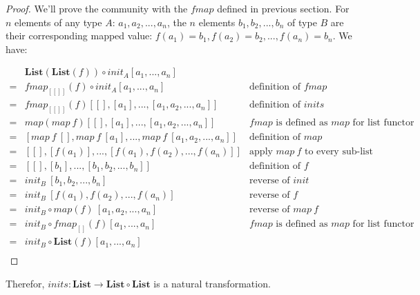 \documentclass{article}
\begin{document}
\begin{example}
\begin{proof}
We'll prove the community with the $fmap$ defined in previous section. For $n$ elements of any type $A$: $a_1, a_2, ..., a_n$, the $n$ elements $b_1, b_2, ..., b_n$ of type $B$ are their corresponding mapped value: $f(a_1) = b_1, f(a_2) = b_2, ..., f(a_n) = b_n$. We have:

\[
\begin{array}{cll}
  & \mathbf{List}(\mathbf{List}(f)) \circ init_A [a_1, ..., a_n] & \\
= & fmap_{[[]]}(f) \circ init_A [a_1, ..., a_n] & \text{definition of $fmap$} \\
= & fmap_{[[]]}(f) [[], [a_1], ..., [a_1, a_2, ..., a_n]] & \text{definition of $inits$} \\
= & map(map\ f) [[], [a_1], ..., [a_1, a_2, ..., a_n]] & \text{$fmap$ is defined as $map$ for list functor} \\
= & [map\ f\ [], map\ f\ [a_1], ..., map\ f\ [a_1, a_2, ..., a_n]] & \text{definition of $map$} \\
= & [[], [f(a_1)], ..., [f(a_1), f(a_2), ..., f(a_n)]] & \text{apply $map\ f$ to every sub-list} \\
= & [[], [b_1], ..., [b_1, b_2, ..., b_n]] & \text{definition of $f$} \\
= & init_B\ [b_1, b_2, ..., b_n] & \text{reverse of $init$} \\
= & init_B\ [f(a_1), f(a_2), ..., f(a_n)] & \text{reverse of $f$} \\
= & init_B \circ map(f)\ [a_1, a_2, ..., a_n] & \text{reverse of $map\ f$} \\
= & init_B \circ fmap_{[]}(f) [a_1, ..., a_n] & \text{$fmap$ is defined as $map$ for list functor} \\
= & init_B \circ \mathbf{List}(f) [a_1, ..., a_n] & \\
\end{array}
\]
\end{proof}

Therefor, $inits : \mathbf{List} \to \mathbf{List} \circ \mathbf{List}$ is a natural transformation.
\end{example}
\end{document}
